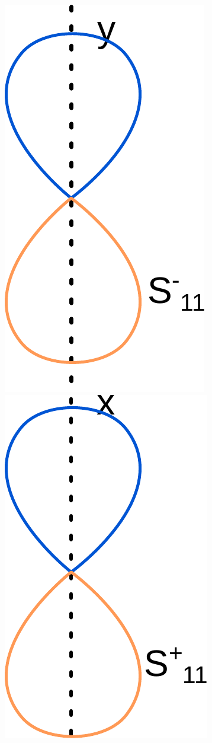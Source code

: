\documentclass[french]{yLectureNote}
\begin{document}
\includegraphics[scale=0.5]{s-11}
\includegraphics[scale=0.5]{s+11}
\end{document}
